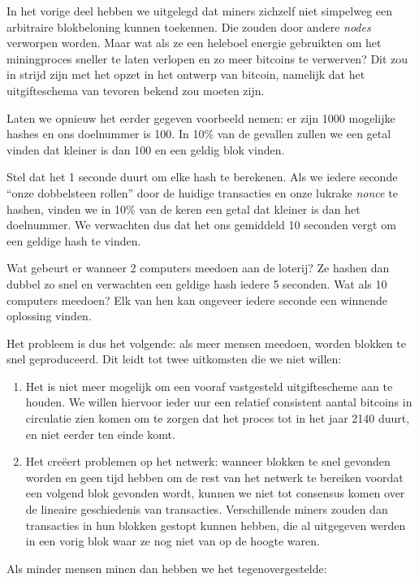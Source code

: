 \documentclass[
  letterpaper,
]{scrbook}
\begin{document}
In het vorige deel hebben we uitgelegd dat miners zichzelf niet
simpelweg een arbitraire blokbeloning kunnen toekennen. Die zouden door
andere \emph{nodes} verworpen worden. Maar wat als ze een heleboel
energie gebruikten om het miningproces sneller te laten verlopen en zo
meer bitcoins te verwerven? Dit zou in strijd zijn met het opzet in het
ontwerp van bitcoin, namelijk dat het uitgifteschema van tevoren bekend
zou moeten zijn.

Laten we opnieuw het eerder gegeven voorbeeld nemen: er zijn 1000
mogelijke hashes en ons doelnummer is 100. In 10\% van de gevallen
zullen we een getal vinden dat kleiner is dan 100 en een geldig blok
vinden.

Stel dat het 1 seconde duurt om elke hash te berekenen. Als we iedere
seconde ``onze dobbelsteen rollen'' door de huidige transacties en onze
lukrake \emph{nonce} te hashen, vinden we in 10\% van de keren een getal
dat kleiner is dan het doelnummer. We verwachten dus dat het ons
gemiddeld 10 seconden vergt om een geldige hash te vinden.

Wat gebeurt er wanneer 2 computers meedoen aan de loterij? Ze hashen dan
dubbel zo snel en verwachten een geldige hash iedere 5 seconden. Wat als
10 computers meedoen? Elk van hen kan ongeveer iedere seconde een
winnende oplossing vinden.

Het probleem is dus het volgende: als meer mensen meedoen, worden
blokken te snel geproduceerd. Dit leidt tot twee uitkomsten die we niet
willen:

\begin{enumerate}
\def\labelenumi{\arabic{enumi}.}
\item
  Het is niet meer mogelijk om een vooraf vastgesteld uitgiftescheme aan
  te houden. We willen hiervoor ieder uur een relatief consistent aantal
  bitcoins in circulatie zien komen om te zorgen dat het proces tot in
  het jaar 2140 duurt, en niet eerder ten einde komt.
\item
  Het creëert problemen op het netwerk: wanneer blokken te snel gevonden
  worden en geen tijd hebben om de rest van het netwerk te bereiken
  voordat een volgend blok gevonden wordt, kunnen we niet tot consensus
  komen over de lineaire geschiedenis van transacties. Verschillende
  miners zouden dan transacties in hun blokken gestopt kunnen hebben,
  die al uitgegeven werden in een vorig blok waar ze nog niet van op de
  hoogte waren.
\end{enumerate}

Als minder mensen minen dan hebben we het tegenovergestelde:
\end{document}
